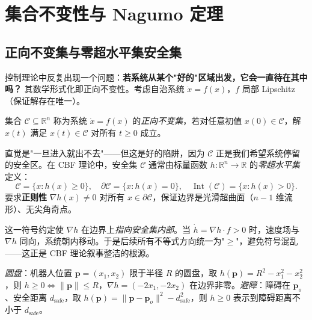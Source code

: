 \section{集合不变性与 Nagumo 定理}
\label{sec:cbf-nagumo}

\subsection{正向不变集与零超水平集安全集}

控制理论中反复出现一个问题：\textbf{若系统从某个"好的"区域出发，它会一直待在其中吗？} 其数学形式化即正向不变性。考虑自治系统 $\dot x=f(x)$，$f$ 局部 Lipschitz（保证解存在唯一）。

\begin{definition}[正向不变集]\label{def:forward-invariant}
集合 $\mathcal C\subseteq\mathbb R^n$ 称为系统 $\dot x=f(x)$ 的\emph{正向不变集}，若对任意初值 $x(0)\in\mathcal C$，解 $x(t)$ 满足 $x(t)\in\mathcal C$ 对所有 $t\ge0$ 成立。
\end{definition}

直觉是"一旦进入就出不去"——但这是好的陷阱，因为 $\mathcal C$ 正是我们希望系统停留的安全区。在 CBF 理论中，安全集 $\mathcal C$ 通常由标量函数 $h:\mathbb R^n\to\mathbb R$ 的\emph{零超水平集}定义：
\begin{equation}
\mathcal C=\{x:h(x)\ge0\},\quad \partial\mathcal C=\{x:h(x)=0\},\quad \operatorname{Int}(\mathcal C)=\{x:h(x)>0\}.
\label{eq:safe-set}
\end{equation}
要求\textbf{正则性} $\nabla h(x)\neq0$ 对所有 $x\in\partial\mathcal C$，保证边界是光滑超曲面（$n-1$ 维流形）、无尖角奇点。

\begin{insight}[为何用 $h\ge0$ 而非 $h\le c$]
这一符号约定使 $\nabla h$ 在边界上\emph{指向安全集内部}。当 $\dot h=\nabla h\cdot f>0$ 时，速度场与 $\nabla h$ 同向，系统朝内移动。于是后续所有不等式方向统一为"$\ge$"，避免符号混乱——这正是 CBF 理论叙事整洁的根源。
\end{insight}

\begin{example}[两个典型安全集]\label{ex:cbf-safesets}
\emph{圆盘}：机器人位置 $\mathbf p=(x_1,x_2)$ 限于半径 $R$ 的圆盘，取 $h(\mathbf p)=R^2-x_1^2-x_2^2$，则 $h\ge0\iff\|\mathbf p\|\le R$，$\nabla h=(-2x_1,-2x_2)$ 在边界非零。\emph{避障}：障碍在 $\mathbf p_o$、安全距离 $d_{\mathrm{safe}}$，取 $h(\mathbf p)=\|\mathbf p-\mathbf p_o\|^2-d_{\mathrm{safe}}^2$，则 $h\ge0$ 表示到障碍距离不小于 $d_{\mathrm{safe}}$。
\end{example}

